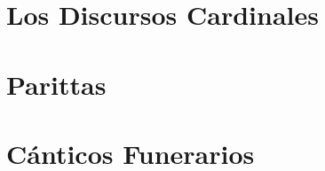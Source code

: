 \suttasPartSettings


\part{Los Discursos Cardinales}

\suttasChapterSettings



\suttasSettingsRestore

%
\part{Parittas}

%

%
%
%
\part{Cánticos Funerarios}
%
%

%


